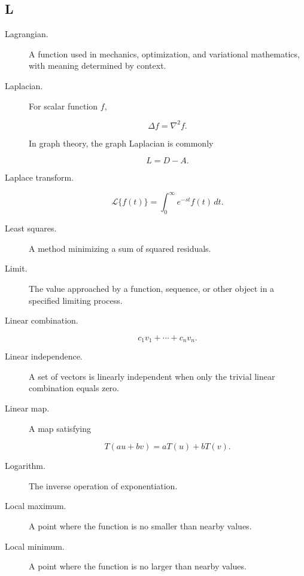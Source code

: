 \subsection*{L}

\begin{description}

\item[Lagrangian.]
A function used in mechanics, optimization, and variational mathematics,
with meaning determined by context.

\item[Laplacian.]
For scalar function \(f\),

\[
\Delta f
=
\nabla^2f.
\]

In graph theory, the graph Laplacian is commonly

\[
L=D-A.
\]

\item[Laplace transform.]

\[
\mathcal{L}\{f(t)\}
=
\int_0^\infty
e^{-st}f(t)\,dt.
\]

\item[Least squares.]
A method minimizing a sum of squared residuals.

\item[Limit.]
The value approached by a function, sequence, or other object in a specified
limiting process.

\item[Linear combination.]

\[
c_1v_1+\cdots+c_nv_n.
\]

\item[Linear independence.]
A set of vectors is linearly independent when only the trivial linear
combination equals zero.

\item[Linear map.]
A map satisfying

\[
T(au+bv)
=
aT(u)+bT(v).
\]

\item[Logarithm.]
The inverse operation of exponentiation.

\item[Local maximum.]
A point where the function is no smaller than nearby values.

\item[Local minimum.]
A point where the function is no larger than nearby values.

\end{description}

